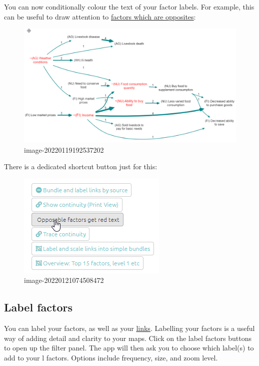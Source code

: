 \documentclass[
]{book}
\begin{document}
You can now conditionally colour the text of your factor labels. For example, this can be useful to draw attention to \href{https://causalmap.shinyapps.io/CM2test/?s=651}{factors which are opposites}:

\begin{figure}
\centering
\includegraphics{_assets/image-20220119192537202.png}
\caption{image-20220119192537202}
\end{figure}

There is a dedicated shortcut button just for this:

\begin{figure}
\centering
\includegraphics{_assets/image-20220121074508472.png}
\caption{image-20220121074508472}
\end{figure}

\hypertarget{xlabel-factors}{%
\subsection{Label factors}\label{xlabel-factors}}

You can label your factors, as well as your \protect\hyperlink{xformattinglinks}{links}. Labelling your factors is a useful way of adding detail and clarity to your maps. Click on the label factors buttons to open up the filter panel. The app will then ask you to choose which label(s) to add to your l factors. Options include frequency, size, and zoom level.
\end{document}
